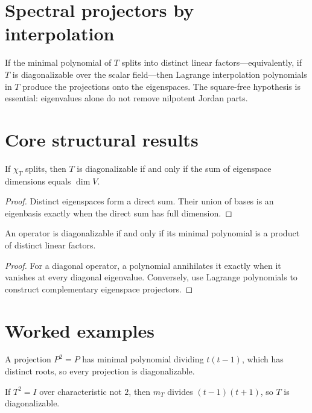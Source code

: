 \section{Spectral projectors by interpolation}
If the minimal polynomial of $T$ splits into distinct linear factors---equivalently, if $T$ is diagonalizable over the scalar field---then Lagrange interpolation polynomials in $T$ produce the projections onto the eigenspaces. The square-free hypothesis is essential: eigenvalues alone do not remove nilpotent Jordan parts.

\section{Core structural results}

\begin{theorem}\label{thm:i11-01}
If $\chi_T$ splits, then $T$ is diagonalizable if and only if the sum of eigenspace dimensions equals $\dim V$.
\begin{proof}
Distinct eigenspaces form a direct sum. Their union of bases is an eigenbasis exactly when the direct sum has full dimension.
\end{proof}
\end{theorem}

\begin{theorem}\label{thm:i11-02}
An operator is diagonalizable if and only if its minimal polynomial is a product of distinct linear factors.
\begin{proof}
For a diagonal operator, a polynomial annihilates it exactly when it vanishes at every diagonal eigenvalue. Conversely, use Lagrange polynomials to construct complementary eigenspace projectors.
\end{proof}
\end{theorem}

\section{Worked examples}

\begin{example}[Projection]\label{ex:i11-worked-01}
A projection $P^2=P$ has minimal polynomial dividing $t(t-1)$, which has distinct roots, so every projection is diagonalizable.
\end{example}

\begin{example}[Involution]\label{ex:i11-worked-02}
If $T^2=I$ over characteristic not $2$, then $m_T$ divides $(t-1)(t+1)$, so $T$ is diagonalizable.
\end{example}

